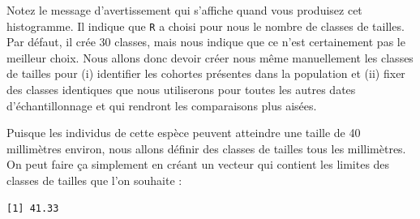 \documentclass[
  a4paper,
  DIV=11,
  numbers=noendperiod,
  oneside]{scrreprt}
\newenvironment{Shaded}{}{}
\newcommand{\AttributeTok}[1]{\textcolor[rgb]{0.84,0.23,0.29}{#1}}
\newcommand{\CommentTok}[1]{\textcolor[rgb]{0.42,0.45,0.49}{#1}}
\newcommand{\ConstantTok}[1]{\textcolor[rgb]{0.00,0.36,0.77}{#1}}
\newcommand{\FunctionTok}[1]{\textcolor[rgb]{0.44,0.26,0.76}{#1}}
\newcommand{\NormalTok}[1]{\textcolor[rgb]{0.14,0.16,0.18}{#1}}
\newcommand{\OtherTok}[1]{\textcolor[rgb]{0.44,0.26,0.76}{#1}}
\newcommand{\SpecialCharTok}[1]{\textcolor[rgb]{0.00,0.36,0.77}{#1}}
\begin{document}

Notez le message d'avertissement qui s'affiche quand vous produisez cet
histogramme. Il indique que \texttt{R} a choisi pour nous le nombre de
classes de tailles. Par défaut, il crée 30 classes, mais nous indique
que ce n'est certainement pas le meilleur choix. Nous allons donc devoir
créer nous même manuellement les classes de tailles pour (i) identifier
les cohortes présentes dans la population et (ii) fixer des classes
identiques que nous utiliserons pour toutes les autres dates
d'échantillonnage et qui rendront les comparaisons plus aisées.

Puisque les individus de cette espèce peuvent atteindre une taille de 40
millimètres environ, nous allons définir des classes de tailles tous les
millimètres. On peut faire ça simplement en créant un vecteur qui
contient les limites des classes de tailles que l'on souhaite :

\begin{Shaded}
\end{Shaded}

\begin{verbatim}
[1] 41.33
\end{verbatim}

\end{document}

